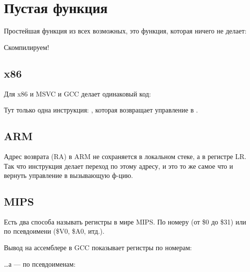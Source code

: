 \section{Пустая функция}
\label{empty_func}

Простейшая функция из всех возможных, это функция, которая ничего не делает:



Скомпилируем!

\subsection{x86}

Для x86 и MSVC и GCC делает одинаковый код:



Тут только одна инструкция: \RET, которая возвращает управление в .

\subsection{ARM}



Адрес возврата (\ac{RA}) в ARM не сохраняется в локальном стеке, а в регистре \ac{LR}.
Так что инструкция  делает переход по этому адресу, и это то же самое что и вернуть управление
в вызывающую ф-цию.

\subsection{MIPS}

Есть два способа называть регистры в мире MIPS. По номеру (от \$0 до \$31) или по псевдоимени (\$V0, \$A0, итд.).

Вывод на ассемблере в GCC показывает регистры по номерам:



\dots а \IDA --- по псевдоименам:




